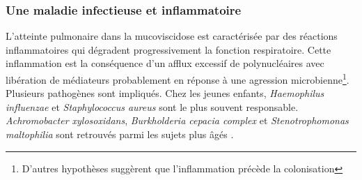 \documentclass[12pt,a4paper]{article}
\begin{document}
\subsubsection{Une maladie infectieuse et inflammatoire}

L’atteinte pulmonaire dans la mucoviscidose est caractérisée par des réactions inflammatoires qui dégradent progressivement la fonction respiratoire. Cette inflammation est la conséquence d'un afflux excessif de polynucléaires avec libération de médiateurs\cite{Heijerman2005} probablement en réponse à une agression microbienne\footnote{D'autres hypothèses suggèrent que l'inflammation précède la colonisation\cite{Heijerman2005}}. Plusieurs pathogènes sont impliqués. Chez les jeunes enfants\cite{Davies}, \textit{Haemophilus influenzae} et \textit{Staphylococcus aureus} sont le plus souvent responsable. \textit{Achromobacter xylosoxidans}, \textit{Burkholderia cepacia complex} et \textit{Stenotrophomonas maltophilia} sont retrouvés parmi les sujets plus âgés \cite{Davies}.
\end{document}
